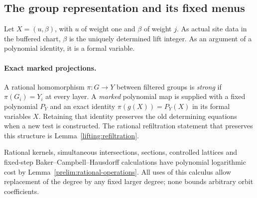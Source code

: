 \subsection{The group representation and its fixed menus}

Let $X=(u,\beta)$, with $u$ of weight one and $\beta$ of weight $j$.
As actual site data in the buffered chart, $\beta$ is the uniquely
determined lift integer.  As an argument of a polynomial identity,
it is a formal variable.

\paragraph{Exact marked projections.}\label{ap:marking-conventions}
A rational homomorphism $\pi:G\to Y$ between filtered groups is
\emph{strong} if $\pi(G_i)=Y_i$ at every layer. A \emph{marked}
polynomial map is supplied with a fixed polynomial $P_Y$ and an
exact identity $\pi(g(X))=P_Y(X)$ in its formal variables $X$.
Retaining that identity preserves the old determining equations
when a new test is constructed. The rational refiltration statement
that preserves this structure is Lemma~\ref{lifting:refiltration}.

Rational kernels, simultaneous intersections, sections, controlled
lattices and fixed-step Baker--Campbell--Hausdorff calculations have
polynomial logarithmic cost by Lemma~\ref{prelim:rational-operations}.
All uses of this calculus allow replacement of the degree by any
fixed larger degree; none bounds arbitrary orbit coefficients.

